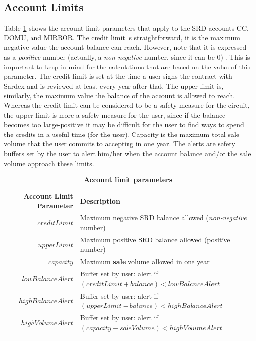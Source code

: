 \subsection{Account Limits}
Table \ref{tab:accountLimits} shows the account limit parameters that apply to the SRD accounts CC, DOMU, and MIRROR. The credit limit is straightforward, it is the maximum negative value the account balance can reach. However, note that it is expressed as a \emph{positive} number (actually, a \emph{non-negative} number, since it can be 0) . This is important to keep in mind for the calculations that are based on the value of this parameter. The credit limit is set at the time a user signs the contract with Sardex and is reviewed at least every year after that. The upper limit is, similarly, the maximum value the balance of the account is allowed to reach. Whereas the credit limit can be considered to be a safety measure for the circuit, the upper limit is more a safety measure for the user, since if the balance becomes too large-positive it may be difficult for the user to find ways to spend the credits in a useful time (for the user). Capacity is the maximum total sale volume that the user commits to accepting in one year. The alerts are safety buffers set by the user to alert him/her when the account balance and/or the sale volume approach these limits.

\setlength{\tabcolsep}{10pt}
\begin{table}[htbp]
\vspace{-0.3cm}
\begin{centering}
\small
{
\begin{tabular}{ r | l  }
\hline
\textbf{Account Limit Parameter} & \textbf{Description} \\
\Xhline{1.5pt}
$creditLimit$& Maximum negative SRD balance allowed (\emph{non-negative} number) \\
\hline
$upperLimit$ & Maximum positive SRD balance allowed (positive number)\\
\hline
$capacity$ & Maximum {\bf sale} volume allowed in one year \\
\hline
$lowBalanceAlert$ & Buffer set by user: alert if $(creditLimit + balance) < lowBalanceAlert$\\
\hline
$highBalanceAlert$ & Buffer set by user: alert if $(upperLimit - balance) < highBalanceAlert$ \\
\hline
$highVolumeAlert$ & Buffer set by user: alert if $(capacity - saleVolume) < highVolumeAlert$ \\
\Xhline{1.5pt}
\end{tabular}
}
\caption{\small\textbf{Account limit parameters}}
\label{tab:accountLimits}
\vspace{-0.3cm}
\end{centering}
\end{table}

